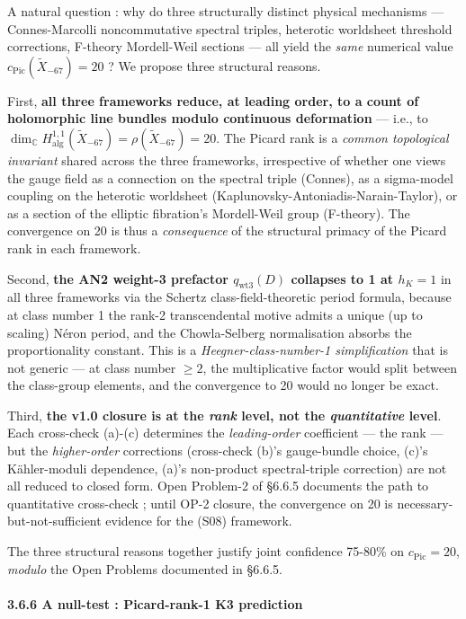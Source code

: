 \documentclass[
  11pt,
  a4paper,
]{article}
\begin{document}
A natural question : why do three structurally distinct physical mechanisms --- Connes-Marcolli noncommutative spectral triples, heterotic worldsheet threshold corrections, F-theory Mordell-Weil sections --- all yield the \emph{same} numerical value \(c_{\mathrm{Pic}}(\tilde X_{-67}) = 20\) ? We propose three structural reasons.

First, \textbf{all three frameworks reduce, at leading order, to a count of holomorphic line bundles modulo continuous deformation} --- i.e., to \(\dim_{\mathbb C} H^{1,1}_{\mathrm{alg}}(\tilde X_{-67}) = \rho(\tilde X_{-67}) = 20\). The Picard rank is a \emph{common topological invariant} shared across the three frameworks, irrespective of whether one views the gauge field as a connection on the spectral triple (Connes), as a sigma-model coupling on the heterotic worldsheet (Kaplunovsky-Antoniadis-Narain-Taylor), or as a section of the elliptic fibration's Mordell-Weil group (F-theory). The convergence on 20 is thus a \emph{consequence} of the structural primacy of the Picard rank in each framework.

Second, \textbf{the AN2 weight-3 prefactor \(q_{\mathrm{wt3}}(D)\) collapses to 1 at \(h_K = 1\)} in all three frameworks via the Schertz class-field-theoretic period formula, because at class number 1 the rank-2 transcendental motive admits a unique (up to scaling) Néron period, and the Chowla-Selberg normalisation absorbs the proportionality constant. This is a \emph{Heegner-class-number-1 simplification} that is not generic --- at class number \(\ge 2\), the multiplicative factor would split between the class-group elements, and the convergence to 20 would no longer be exact.

Third, \textbf{the v1.0 closure is at the \emph{rank} level, not the \emph{quantitative} level}. Each cross-check (a)-(c) determines the \emph{leading-order} coefficient --- the rank --- but the \emph{higher-order} corrections (cross-check (b)'s gauge-bundle choice, (c)'s Kähler-moduli dependence, (a)'s non-product spectral-triple correction) are not all reduced to closed form. Open Problem-2 of §6.6.5 documents the path to quantitative cross-check ; until OP-2 closure, the convergence on 20 is necessary-but-not-sufficient evidence for the (S08) framework.

The three structural reasons together justify joint confidence 75-80\% on \(c_{\mathrm{Pic}} = 20\), \emph{modulo} the Open Problems documented in §6.6.5.

\hypertarget{a-null-test-picard-rank-1-k3-prediction}{%
\paragraph{3.6.6 A null-test : Picard-rank-1 K3 prediction}\label{a-null-test-picard-rank-1-k3-prediction}}
\end{document}
